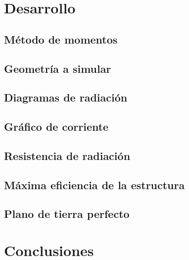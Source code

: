 \documentclass[10pt,a4paper]{article}
\begin{document}
		
	\setcounter{page}{1}
	\section{Desarrollo}
		
		\subsection{Método de momentos}
			
		\subsection{Geometría a simular}
			
		\subsection{Diagramas de radiación}
			
		\subsection{Gráfico de corriente}
			
		\subsection{Resistencia de radiación}
			
		\subsection{Máxima eficiencia de la estructura}
			
		\subsection{Plano de tierra perfecto}
					
	\pagebreak					
	\section{Conclusiones}
		
		
\end{document}
